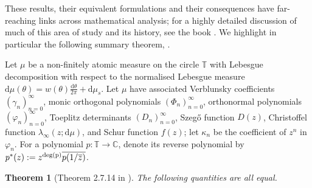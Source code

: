 \documentclass[11pt,reqno]{amsart}
\newcommand\norm[1]{\left\lVert#1\right\rVert}
\def\p{\varphi}
\def\l{\lambda}
\def\g{\gamma}
\def\k{\kappa}
\def\th{\theta}
\def\P{\Phi}
\def\rmd{\mathrm{d}}
\def\CC{\mathbb{C}}
\def\TT{\mathbb{T}}
\newtheorem{theorem}{Theorem}[section]
\theoremstyle{definition}
\numberwithin{equation}{section}
\begin{document}
These results, their equivalent formulations and their consequences have far-reaching links across mathematical analysis; for a highly detailed discussion of much of this area of study and its history, see the book \cite{Sim05}. We highlight in particular the following summary theorem, \cite[Theorem 2.7.14]{Sim05}.

Let \(\mu\) be a non-finitely atomic measure on the circle \(\TT\) with Lebesgue decomposition with respect to the normalised Lebesgue measure \(\rmd\mu(\th) = w(\th)\frac{\rmd \th}{2\pi} + \rmd \mu_s \). Let \(\mu\) have associated Verblunsky coefficients \((\g_n)_{n=0}^{\infty}\), monic orthogonal polynomials \((\Phi_n)_{n=0}^{\infty}\), orthonormal polynomials \((\p_n)_{n=0}^{\infty}\), Toeplitz determinants \((D_n)_{n=0}^{\infty}\), Szeg\H{o} function \(D(z)\), Christoffel function \(\l_\infty(z; \rmd\mu)\), and Schur function \(f(z)\); let \(\k_n\) be the coefficient of \(z^n\) in \(\p_n\). For a polynomial \(p : \TT \to \CC\), denote its reverse polynomial by \(p^*(z) := z^{\rm{deg}(p)}\overline{p(1/\overline{z})}\). 

\begin{theorem}[Theorem 2.7.14 in \cite{Sim05}]
    \label{thm:CommSzego}
    The following quantities are all equal.
\end{theorem}
\end{document}
